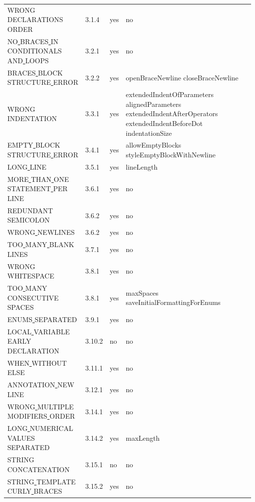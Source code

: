 \begin{center}
\begin{longtable}{ |l|p{0.8cm}|p{0.8cm}| p{3cm} | }
WRONG\underline{ }DECLARATIONS\underline{ }ORDER & 3.1.4 &  yes  &   no  \\
NO\underline{ }BRACES\underline{ }IN\underline{ }CONDITIONALS\underline{ }AND\underline{ }LOOPS & 3.2.1 &  yes  &   no  \\
BRACES\underline{ }BLOCK\underline{ }STRUCTURE\underline{ }ERROR & 3.2.2 &  yes  &   openBraceNewline closeBraceNewline  \\
WRONG\underline{ }INDENTATION & 3.3.1 &  yes  &  extendedIndentOfParameters alignedParameters extendedIndentAfterOperators extendedIndentBeforeDot indentationSize   \\
EMPTY\underline{ }BLOCK\underline{ }STRUCTURE\underline{ }ERROR & 3.4.1 &  yes  &   allowEmptyBlocks styleEmptyBlockWithNewline  \\
LONG\underline{ }LINE & 3.5.1 &  yes  &   lineLength                 \\
MORE\underline{ }THAN\underline{ }ONE\underline{ }STATEMENT\underline{ }PER\underline{ }LINE & 3.6.1 &  yes  &   no  \\
REDUNDANT\underline{ }SEMICOLON & 3.6.2 &  yes  &   no  \\
WRONG\underline{ }NEWLINES & 3.6.2 &  yes  &   no  \\
TOO\underline{ }MANY\underline{ }BLANK\underline{ }LINES & 3.7.1 &  yes  &   no  \\
WRONG\underline{ }WHITESPACE & 3.8.1 &  yes  &   no  \\
TOO\underline{ }MANY\underline{ }CONSECUTIVE\underline{ }SPACES & 3.8.1 &  yes  &   maxSpaces saveInitialFormattingForEnums  \\
ENUMS\underline{ }SEPARATED & 3.9.1 &  yes  &   no  \\
LOCAL\underline{ }VARIABLE\underline{ }EARLY\underline{ }DECLARATION & 3.10.2 &  no  &   no  \\
WHEN\underline{ }WITHOUT\underline{ }ELSE & 3.11.1 &  yes  &   no  \\
ANNOTATION\underline{ }NEW\underline{ }LINE & 3.12.1 &  yes  &   no  \\
WRONG\underline{ }MULTIPLE\underline{ }MODIFIERS\underline{ }ORDER & 3.14.1 &  yes  &   no  \\
LONG\underline{ }NUMERICAL\underline{ }VALUES\underline{ }SEPARATED & 3.14.2 &  yes  &   maxLength                  \\
STRING\underline{ }CONCATENATION & 3.15.1 &  no  &   no  \\
STRING\underline{ }TEMPLATE\underline{ }CURLY\underline{ }BRACES & 3.15.2 &  yes  &   no  \\

\end{longtable}
\end{center}
